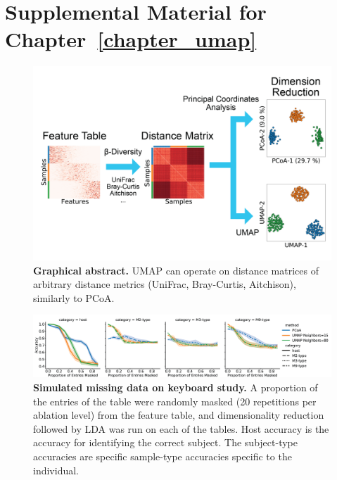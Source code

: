 \chapter{Supplemental Material for 
Chapter~\ref{chapter_umap}}

\begin{figure}[htbp]
\centering
\includegraphics[width=\textwidth]{umap-figures/figureS01.png}
\caption[Graphical abstract.]{\textbf{Graphical abstract.} UMAP can operate on distance matrices of arbitrary distance metrics (UniFrac, Bray-Curtis, Aitchison), similarly to PCoA.}
\label{umap_figS1}
\end{figure}

\begin{figure}[htbp]
\centering
\includegraphics[width=\textwidth]{umap-figures/figureS02.png}
\caption[Simulated missing data on keyboard study.]{\textbf{Simulated missing data on keyboard study.} A proportion of the entries of the table were randomly masked (20 repetitions per ablation level) from the feature table, and dimensionality reduction followed by LDA was run on each of the tables. Host accuracy is the accuracy for identifying the correct subject. The subject-type accuracies are specific sample-type accuracies specific to the individual.}
\label{umap_figS2}
\end{figure}

